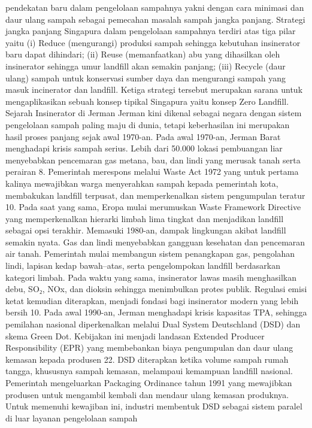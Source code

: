 \documentclass[
  letterpaper,
  DIV=11,
  numbers=noendperiod]{scrreprt}
\begin{document}
pendekatan baru dalam pengelolaan sampahnya yakni dengan cara minimasi
dan daur ulang sampah sebagai pemecahan masalah sampah jangka panjang.
Strategi jangka panjang Singapura dalam pengelolaan sampahnya terdiri
atas tiga pilar yaitu (i) Reduce (mengurangi) produksi sampah sehingga
kebutuhan insinerator baru dapat dihindari; (ii) Reuse (memanfaatkan)
abu yang dihasilkan oleh insinerator sehingga umur landfill akan semakin
panjang; (iii) Recycle (daur ulang) sampah untuk konservasi sumber daya
dan mengurangi sampah yang masuk incinerator dan landfill. Ketiga
strategi tersebut merupakan sarana untuk mengaplikasikan sebuah konsep
tipikal Singapura yaitu konsep Zero Landfill. Sejarah Insinerator di
Jerman Jerman kini dikenal sebagai negara dengan sistem pengelolaan
sampah paling maju di dunia, tetapi keberhasilan ini merupakan hasil
proses panjang sejak awal 1970-an. Pada awal 1970-an, Jerman Barat
menghadapi krisis sampah serius. Lebih dari 50.000 lokasi pembuangan
liar menyebabkan pencemaran gas metana, bau, dan lindi yang merusak
tanah serta perairan 8. Pemerintah merespons melalui Waste Act 1972 yang
untuk pertama kalinya mewajibkan warga menyerahkan sampah kepada
pemerintah kota, membakukan landfill terpusat, dan memperkenalkan sistem
pengumpulan teratur 10. Pada saat yang sama, Eropa mulai merumuskan
Waste Framework Directive yang memperkenalkan hierarki limbah lima
tingkat dan menjadikan landfill sebagai opsi terakhir. Memasuki 1980-an,
dampak lingkungan akibat landfill semakin nyata. Gas dan lindi
menyebabkan gangguan kesehatan dan pencemaran air tanah. Pemerintah
mulai membangun sistem penangkapan gas, pengolahan lindi, lapisan kedap
bawah--atas, serta pengelompokan landfill berdasarkan kategori limbah.
Pada waktu yang sama, insinerator lawas masih menghasilkan debu, SO₂,
NOx, dan dioksin sehingga menimbulkan protes publik. Regulasi emisi
ketat kemudian diterapkan, menjadi fondasi bagi insinerator modern yang
lebih bersih 10. Pada awal 1990-an, Jerman menghadapi krisis kapasitas
TPA, sehingga pemilahan nasional diperkenalkan melalui Dual System
Deutschland (DSD) dan skema Green Dot. Kebijakan ini menjadi landasan
Extended Producer Responsibility (EPR) yang membebankan biaya
pengumpulan dan daur ulang kemasan kepada produsen 22. DSD diterapkan
ketika volume sampah rumah tangga, khususnya sampah kemasan, melampaui
kemampuan landfill nasional. Pemerintah mengeluarkan Packaging Ordinance
tahun 1991 yang mewajibkan produsen untuk mengambil kembali dan mendaur
ulang kemasan produknya. Untuk memenuhi kewajiban ini, industri
membentuk DSD sebagai sistem paralel di luar layanan pengelolaan sampah
\end{document}
